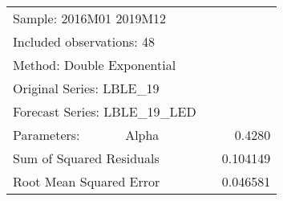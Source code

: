 \begin{tabular}{lrrrr}
\toprule
\multicolumn{3}{l}{Sample: 2016M01 2019M12}&\multicolumn{1}{c}{}&\multicolumn{1}{c}{}\\
\multicolumn{3}{l}{Included observations: 48}&\multicolumn{1}{c}{}&\multicolumn{1}{c}{}\\
\multicolumn{3}{l}{Method: Double Exponential}&\multicolumn{1}{c}{}&\multicolumn{1}{c}{}\\
\multicolumn{3}{l}{Original Series: LBLE\_19}&\multicolumn{1}{c}{}&\multicolumn{1}{c}{}\\
\multicolumn{3}{l}{Forecast Series: LBLE\_19\_LED}&\multicolumn{1}{c}{}&\multicolumn{1}{c}{}\\
\midrule
\multicolumn{1}{l}{Parameters:}&\multicolumn{1}{l}{Alpha}&\multicolumn{1}{c}{}&\multicolumn{1}{c}{}&\multicolumn{1}{r}{0.4280}\\
\multicolumn{3}{l}{Sum of Squared Residuals}&\multicolumn{1}{c}{}&\multicolumn{1}{r}{0.104149}\\
\multicolumn{3}{l}{Root Mean Squared Error}&\multicolumn{1}{c}{}&\multicolumn{1}{r}{0.046581}\\
\bottomrule
\end{tabular}